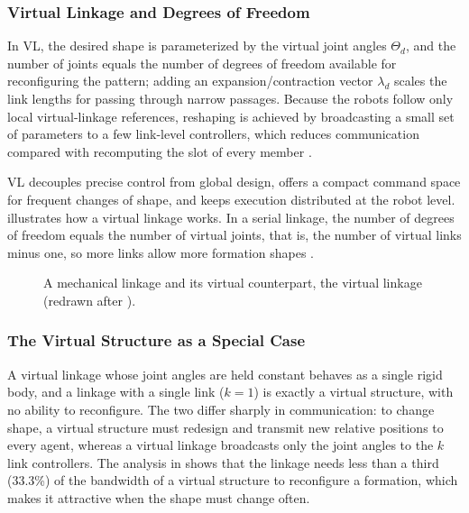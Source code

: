 \subsubsection{Virtual Linkage and Degrees of Freedom}

In VL, the desired shape is parameterized by the virtual joint angles
$\Theta_d$, and the number of joints equals the number of degrees of freedom
available for reconfiguring the pattern; adding an expansion/contraction vector
$\lambda_d$ scales the link lengths for passing through narrow passages. Because
the robots follow only local virtual-linkage references, reshaping is achieved
by broadcasting a small set of parameters to a few link-level controllers, which
reduces communication compared with recomputing the slot of every member
\cite{liu2018virtual}.

VL decouples precise control from global design, offers a compact command space
for frequent changes of shape, and keeps execution distributed at the robot
level.  illustrates how a virtual linkage works. In a
serial linkage, the number of degrees of freedom equals the number of virtual
joints, that is, the number of virtual links minus one, so more links allow more
formation shapes \cite{liu2018virtual}.

\begin{figure}[htbp]
  \centering
  \caption{A mechanical linkage and its virtual counterpart, the virtual linkage
           (redrawn after \cite{liu2018virtual}).}
  \label{fig:virtual-linkage}
\end{figure}

\subsubsection{The Virtual Structure as a Special Case}

A virtual linkage whose joint angles are held constant behaves as a single rigid
body, and a linkage with a single link ($k = 1$) is exactly a virtual structure,
with no ability to reconfigure. The two differ sharply in communication: to
change shape, a virtual structure must redesign and transmit new relative
positions to every agent, whereas a virtual linkage broadcasts only the joint
angles to the $k$ link controllers. The analysis in \cite{liu2018virtual} shows
that the linkage needs less than a third (33.3\%) of the bandwidth of a virtual
structure to reconfigure a formation, which makes it attractive when the shape
must change often.

